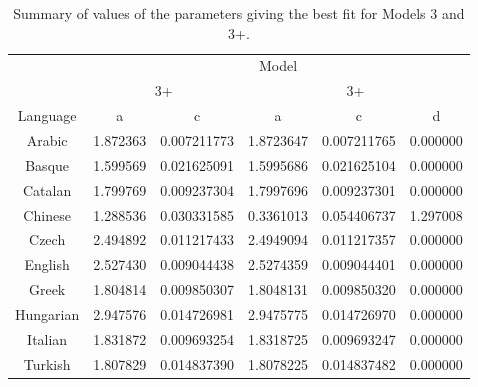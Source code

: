\documentclass{article}
\begin{document}
\begin{table}[H]
\centering
\begin{tabular}{c|cc|ccc|}
    \cline{2-6}
    & \multicolumn{5}{c|}{Model} \\
    \cline{2-6}
    & \multicolumn{2}{c|}{3+} & \multicolumn{3}{c|}{3+} \\
    \hline
    \multicolumn{1}{|c|}{Language}  & a & c & a & c & d\\
    \hline
    \multicolumn{1}{|c|}{Arabic}    & 1.872363    & 0.007211773 & 1.8723647    & 0.007211765  & 0.000000    \\
    \multicolumn{1}{|c|}{Basque}    & 1.599569    & 0.021625091 & 1.5995686    & 0.021625104  & 0.000000    \\
    \multicolumn{1}{|c|}{Catalan}   & 1.799769    & 0.009237304 & 1.7997696    & 0.009237301  & 0.000000    \\
    \multicolumn{1}{|c|}{Chinese}   & 1.288536    & 0.030331585& 0.3361013    & 0.054406737  & 1.297008    \\
    \multicolumn{1}{|c|}{Czech}     & 2.494892    & 0.011217433 & 2.4949094    & 0.011217357  & 0.000000    \\
    \multicolumn{1}{|c|}{English}   & 2.527430    & 0.009044438 & 2.5274359    & 0.009044401  & 0.000000    \\
    \multicolumn{1}{|c|}{Greek}     & 1.804814    & 0.009850307 & 1.8048131    & 0.009850320  & 0.000000    \\
    \multicolumn{1}{|c|}{Hungarian} & 2.947576    & 0.014726981 & 2.9475775    & 0.014726970  & 0.000000    \\
    \multicolumn{1}{|c|}{Italian}   & 1.831872    & 0.009693254 & 1.8318725    & 0.009693247  & 0.000000    \\
    \multicolumn{1}{|c|}{Turkish}   & 1.807829    & 0.014837390 & 1.8078225    & 0.014837482  & 0.000000    \\
    \hline
\end{tabular}
\label{Table:T7}
\caption{Summary of values of the parameters giving the best fit for Models 3 and 3+.}
\end{table}
\end{document}
